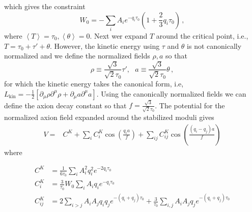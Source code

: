 \documentclass[12pt]{article}
\begin{document}
which gives the constraint
\begin{equation} \label{eq:KKLT:W0}
  W_0 = -\sum_i A_i e^{-q_i \tau_0} \left(1 + \frac{2}{3} q_i \tau_0\right)\,,
\end{equation}
where $\left<T\right> = \tau_0, \left<\theta\right> = 0$.
Next wer expand $T$ around the critical point, i.e., $T = \tau_0 + \tau' + \theta$.
However, the kinetic energy using $\tau$ and $\theta$ is not canonically normalized and we define the normalized fields $\rho, a$ so that
\begin{equation} \label{eq:KKLT:rho.a}
  \rho \equiv \frac{\sqrt 3}{\sqrt{2} \tau_0} \tau',
  ~~~ a \equiv \frac{\sqrt 3}{\sqrt{2} \tau_0} \theta\,,
\end{equation}
for which the kinetic energy takes the canonical form, i.e, $L_\text{kin} = -\frac{1}{2} \left[\partial_\mu \rho \partial^\mu \rho + \partial_\mu a \partial^\mu a\right]$.
Using the canonically normalized fields we can define the axion decay constant so that $f = \frac{\sqrt 3}{\sqrt{2} \tau_0}$.
The potential for the normalized axion field expanded around the stabilized moduli gives
\begin{equation} \label{eq:KKLT:Vslow}
  \begin{aligned}
    V = &C^{K}+ \sum_i C^K_i    \cos\left(\frac{q_i a}{f}\right)    
    +
    \sum_{ij} C^{K}_{ij} 
        \cos\left(\frac{\left(q_i - q_j\right) a}{f}\right)
  \end{aligned}
\end{equation}
where

\begin{equation} \label{eq:KKLT:Vslow-2}
  \begin{aligned}
    C^{K} &= \frac{1}{6 \tau_0}  \sum_i A^2_i q^2_i e^{-2 q_i \tau_0}\\
   C^K_i &= \frac{3}{\tau_0} W_0 \sum_i A_i q_i e^{-q_i \tau_0} \\
     C^{K}_{ij}&= 
     2 \sum_{i > j} A_i A_j q_i q_j e^{-\left(q_i + q_j\right)\tau_0}
                     + \frac{3}{\tau_0} \sum_{i, j} A_i A_j q_j e^{-\left(q_i + q_j\right) \tau_0}
  \end{aligned}
\end{equation}
\end{document}
